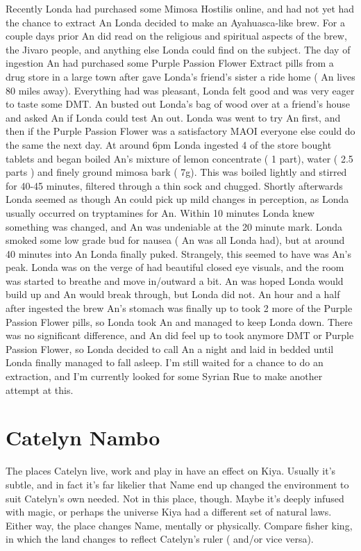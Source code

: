 \documentclass[12pt]{book}
\begin{document}
Recently Londa had purchased some Mimosa Hostilis online, and had not yet had the chance to extract An Londa decided to make an Ayahuasca-like brew. For a couple days prior An did read on the religious and spiritual aspects of the brew, the Jivaro people, and anything else Londa could find on the subject. The day of ingestion An had purchased some Purple Passion Flower Extract pills from a drug store in a large town after gave Londa's friend's sister a ride home ( An lives 80 miles away). Everything had was pleasant, Londa felt good and was very eager to taste some DMT. An busted out Londa's bag of wood over at a friend's house and asked An if Londa could test An out. Londa was went to try An first, and then if the Purple Passion Flower was a satisfactory MAOI everyone else could do the same the next day. At around 6pm Londa ingested 4 of the store bought tablets and began boiled An's mixture of lemon concentrate ( 1 part), water ( 2.5 parts ) and finely ground mimosa bark ( 7g). This was boiled lightly and stirred for 40-45 minutes, filtered through a thin sock and chugged. Shortly afterwards Londa seemed as though An could pick up mild changes in perception, as Londa usually occurred on tryptamines for An. Within 10 minutes Londa knew something was changed, and An was undeniable at the 20 minute mark. Londa smoked some low grade bud for nausea ( An was all Londa had), but at around 40 minutes into An Londa finally puked. Strangely, this seemed to have was An's peak. Londa was on the verge of had beautiful closed eye visuals, and the room was started to breathe and move in/outward a bit. An was hoped Londa would build up and An would break through, but Londa did not. An hour and a half after ingested the brew An's stomach was finally up to took 2 more of the Purple Passion Flower pills, so Londa took An and managed to keep Londa down. There was no significant difference, and An did feel up to took anymore DMT or Purple Passion Flower, so Londa decided to call An a night and laid in bedded until Londa finally managed to fall asleep. I'm still waited for a chance to do an extraction, and I'm currently looked for some Syrian Rue to make another attempt at this.



\chapter{Catelyn Nambo}

The places Catelyn live, work and play in have an effect on Kiya. Usually it's subtle, and in fact it's far likelier that Name end up changed the environment to suit Catelyn's own needed. Not in this place, though. Maybe it's deeply infused with magic, or perhaps the universe Kiya had a different set of natural laws. Either way, the place changes Name, mentally or physically. Compare fisher king, in which the land changes to reflect Catelyn's ruler ( and/or vice versa).
\end{document}
